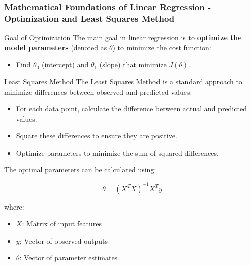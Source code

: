 \documentclass[aspectratio=169]{beamer}
\begin{document}
\begin{frame}[fragile]
    \frametitle{Mathematical Foundations of Linear Regression - Optimization and Least Squares Method}
    
    \begin{block}{Goal of Optimization}
        The main goal in linear regression is to \textbf{optimize the model parameters} (denoted as \(\theta\)) to minimize the cost function:
        
        \begin{itemize}
            \item Find \( \theta_0 \) (intercept) and \( \theta_1 \) (slope) that minimize \( J(\theta) \).
        \end{itemize}
    \end{block}
    
    \begin{block}{Least Squares Method}
        The Least Squares Method is a standard approach to minimize differences between observed and predicted values:
        
        \begin{itemize}
            \item For each data point, calculate the difference between actual and predicted values.
            \item Square these differences to ensure they are positive.
            \item Optimize parameters to minimize the sum of squared differences.
        \end{itemize}
        
        The optimal parameters can be calculated using:
        
        \begin{equation}
            \theta = (X^T X)^{-1} X^T y
        \end{equation}
        
        where:
        \begin{itemize}
            \item \( X \): Matrix of input features
            \item \( y \): Vector of observed outputs
            \item \( \theta \): Vector of parameter estimates
        \end{itemize}
    \end{block}
    
\end{frame}
\end{document}
